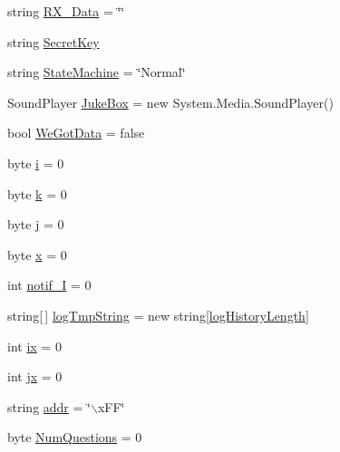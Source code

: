 \begin{DoxyCompactItemize}
\item 
string \hyperlink{class_sr_p___classroom_inq_1_1frm_classrrom_inq_ab11c567168df8023b691c4adf4a149ad}{\-R\-X\-\_\-\-Data} = \char`\"{}\char`\"{}
\item 
string \hyperlink{class_sr_p___classroom_inq_1_1frm_classrrom_inq_ae3ddacd233e71c710d89e12401af37c1}{\-Secret\-Key}
\item 
string \hyperlink{class_sr_p___classroom_inq_1_1frm_classrrom_inq_a4858c67d60a267f02e6c97085f2aee71}{\-State\-Machine} = \char`\"{}\-Normal\char`\"{}
\item 
\-Sound\-Player \hyperlink{class_sr_p___classroom_inq_1_1frm_classrrom_inq_a10f0b7ba2800c1353aeee71344d08a94}{\-Juke\-Box} = new \-System.\-Media.\-Sound\-Player()
\item 
bool \hyperlink{class_sr_p___classroom_inq_1_1frm_classrrom_inq_a44eb31e84ef4705e39c15c4d6047807e}{\-We\-Got\-Data} = false
\item 
byte \hyperlink{class_sr_p___classroom_inq_1_1frm_classrrom_inq_aa757c37b373c81fd9ac14b89ad217df0}{i} = 0
\item 
byte \hyperlink{class_sr_p___classroom_inq_1_1frm_classrrom_inq_ad13cb123edd99d95b379613aad0f2a39}{k} = 0
\item 
byte \hyperlink{class_sr_p___classroom_inq_1_1frm_classrrom_inq_a2eb87c50d0e2c90c1256a6e26cc8a651}{j} = 0
\item 
byte \hyperlink{class_sr_p___classroom_inq_1_1frm_classrrom_inq_ab6836b7a465c2251301a02d9da5c3c31}{x} = 0
\item 
int \hyperlink{class_sr_p___classroom_inq_1_1frm_classrrom_inq_a55f84efe1ba2cfb49d836798a1db3477}{notif\-\_\-\-I} = 0
\item 
string\mbox{[}$\,$\mbox{]} \hyperlink{class_sr_p___classroom_inq_1_1frm_classrrom_inq_acf11c4997f1ad160ca28e4d7b1489f08}{log\-Tmp\-String} = new string\mbox{[}\hyperlink{class_sr_p___classroom_inq_1_1frm_classrrom_inq_a0b55eb955abb243808249457ac92ca93}{log\-History\-Length}\mbox{]}
\item 
int \hyperlink{class_sr_p___classroom_inq_1_1frm_classrrom_inq_a1f5209850965916fddf21b2409e6204a}{ix} = 0
\item 
int \hyperlink{class_sr_p___classroom_inq_1_1frm_classrrom_inq_a6206484c9b4d5d7558f8904cad77cded}{jx} = 0
\item 
string \hyperlink{class_sr_p___classroom_inq_1_1frm_classrrom_inq_ab99245163109493292f36ab5011c4f76}{addr} = \char`\"{}$\backslash$x\-F\-F\char`\"{}
\item 
byte \hyperlink{class_sr_p___classroom_inq_1_1frm_classrrom_inq_a7e4d497088afdd32623b3b54749210a0}{\-Num\-Questions} = 0

\end{DoxyCompactItemize}
